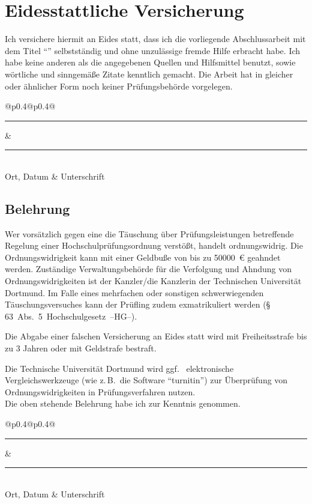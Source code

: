 \thispagestyle{empty}
\section*{Eidesstattliche Versicherung}
Ich versichere hiermit an Eides statt, dass ich die vorliegende Abschlussarbeit mit dem Titel \enquote{\thetitle} selbstständig und ohne unzulässige fremde Hilfe erbracht habe.
Ich habe keine anderen als die angegebenen Quellen und Hilfsmittel benutzt, sowie wörtliche und sinngemäße Zitate kenntlich gemacht. 
Die Arbeit hat in gleicher oder ähnlicher Form noch keiner Prüfungsbehörde vorgelegen.

\vspace*{1cm}\noindent
\begin{center}
  \begin{tabular}{@{}p{0.4\textwidth}@{\hspace{0.15\textwidth}}p{0.4\textwidth}@{}}
  \rule{\linewidth}{0.25pt}& \rule{\linewidth}{0.25pt}\\
  Ort, Datum & Unterschrift
  \end{tabular}
\end{center}

\subsection*{Belehrung}
Wer vorsätzlich gegen eine die Täuschung über Prüfungsleistungen betreffende Regelung einer Hochschulprüfungsordnung verstößt, handelt ordnungswidrig.
Die Ordnungswidrigkeit kann mit einer Geldbuße von bis zu \SI[round-mode=places, round-precision=2]{50000}{€} geahndet werden. 
Zuständige Verwaltungsbehörde für die Verfolgung und Ahndung von Ordnungswidrigkeiten ist der Kanzler/die Kanzlerin der Technischen Universität Dortmund. 
Im Falle eines mehrfachen oder sonstigen schwerwiegenden Täuschungsversuches kann der Prüfling zudem exmatrikuliert werden \mbox{(\S\,63 Abs. 5 Hochschulgesetz --HG--).}

Die Abgabe einer falschen Versicherung an Eides statt wird 
mit Freiheitsstrafe bis zu 3 Jahren oder mit Geldstrafe bestraft.

Die Technische Universität Dortmund wird ggf. \ elektronische Vergleichswerkzeuge
(wie z.\,B.\ die Software \enquote{turnitin}) zur Überprüfung von 
Ordnungswidrigkeiten in Prüfungsverfahren nutzen. 
\\[\baselineskip]

\noindent Die oben stehende Belehrung habe ich zur Kenntnis genommen.\\[1cm]
\begin{center}
\begin{tabular}{@{}p{0.4\textwidth}@{\hspace{0.15\textwidth}}p{0.4\textwidth}@{}}
\rule{\linewidth}{0.25pt}& \rule{\linewidth}{0.25pt}\\
Ort, Datum & Unterschrift
\end{tabular}
\end{center}
